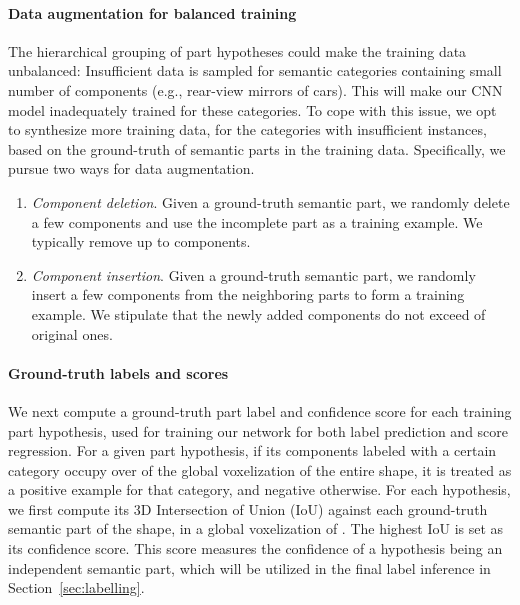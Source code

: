 \documentclass[acmtog]{acmart}
\newcommand{\new}[1]{{\color{black}#1}}
\begin{document}
\paragraph{\textbf{Data augmentation for balanced training}}
\new{
The hierarchical grouping of part hypotheses could
make the training data unbalanced: Insufficient data is sampled for
semantic categories containing small number of components (e.g., rear-view mirrors of cars).
This will make our CNN model inadequately trained for these categories.
To cope with this issue,
we opt to synthesize more training data, for the categories with insufficient instances,
based on the ground-truth of semantic parts in the training data.
Specifically, we pursue two ways for data augmentation.
\begin{enumerate}
  \item \textsl{Component deletion}. Given a ground-truth semantic part, we randomly delete a few components and use the incomplete part as a training example. We typically remove up to  components.
  \item \textsl{Component insertion}. Given a ground-truth semantic part, we randomly insert a few components from the neighboring parts to form a training example. We stipulate that the newly added components do not exceed  of original ones.
\end{enumerate}
}


\paragraph{\textbf{Ground-truth labels and scores}}
We next compute a ground-truth part label and confidence score for each training part hypothesis,
used for training our network for both label prediction and score regression.
For a given part hypothesis, if its components labeled with a certain category
occupy over  of the global voxelization of the entire shape, it is treated as a positive example
for that category, and negative otherwise.
For each hypothesis, we first compute its 3D Intersection of Union (IoU)
against each ground-truth semantic part of the shape, in a global voxelization of .
The highest IoU is set as its confidence score.
This score measures the confidence of a hypothesis being an independent semantic part,
which will be utilized in the final label inference in Section~\ref{sec:labelling}.
\end{document}
